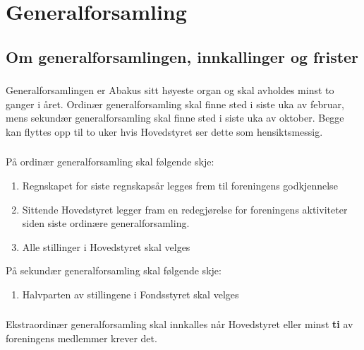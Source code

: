 \section{Generalforsamling}
\subsection{Om generalforsamlingen, innkallinger og frister}
\subsubsection{}
Generalforsamlingen er Abakus sitt høyeste organ og skal avholdes minst to ganger i året.  
Ordinær generalforsamling skal finne sted i siste uka av februar, mens sekundær generalforsamling 
skal finne sted i siste uka av oktober. Begge kan flyttes opp til to uker hvis Hovedstyret ser dette som hensiktsmessig.

\subsubsection{}
På ordinær generalforsamling skal følgende skje: 
\begin{enumerate}[label=\alph*)]
    \item Regnskapet for siste regnskapsår legges frem til foreningens godkjennelse
    \item Sittende Hovedstyret legger fram en redegjørelse for foreningens aktiviteter siden siste ordinære generalforsamling.
    \item Alle stillinger i Hovedstyret skal velges
\end{enumerate}

På sekundær generalforsamling skal følgende skje:
\begin{enumerate}[label=\alph*)]
    \item Halvparten av stillingene i Fondsstyret skal velges
\end{enumerate}

\subsubsection{}
Ekstraordinær generalforsamling skal innkalles når Hovedstyret eller minst
\textbf{ti} av foreningens medlemmer krever det.

